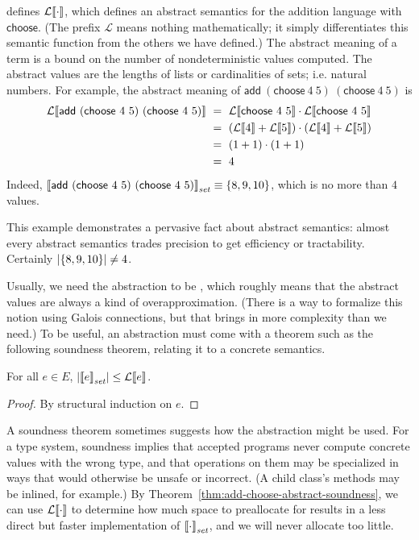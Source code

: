 { defines $\mathcal{L}\!\left\llbracket{\cdot}\right\rrbracket$, which defines an abstract semantics for the addition language with $\mathsf{choose}$.
(The prefix $\mathcal{L}$ means nothing mathematically; it simply differentiates this semantic function from the others we have defined.)
The abstract meaning of a term is a bound on the number of nondeterministic values computed.
The abstract values are the lengths of lists or cardinalities of sets; i.e. natural numbers.
For example, the abstract meaning of $\mathsf{add}~(\mathsf{choose}~4~5)~(\mathsf{choose}~4~5)$ is
\begin{equation}
\begin{aligned}
	\mathcal{L}\!\left\llbracket{\mathsf{add}~(\mathsf{choose}~4~5)~(\mathsf{choose}~4~5)}\right\rrbracket
	&\ =\ \mathcal{L}\!\left\llbracket{\mathsf{choose}~4~5}\right\rrbracket \cdot \mathcal{L}\!\left\llbracket{\mathsf{choose}~4~5}\right\rrbracket
\\
	&\ =\ (\mathcal{L}\!\left\llbracket{4}\right\rrbracket + \mathcal{L}\!\left\llbracket{5}\right\rrbracket) \cdot (\mathcal{L}\!\left\llbracket{4}\right\rrbracket + \mathcal{L}\!\left\llbracket{5}\right\rrbracket)
\\
	&\ =\ (1 + 1) \cdot (1 + 1)
\\
	&\ =\ 4
\end{aligned}
\end{equation}
Indeed, $\left\llbracket{\mathsf{add}~(\mathsf{choose}~4~5)~(\mathsf{choose}~4~5)}\right\rrbracket_\mathit{set} \equiv \{{8,9,10}\}$, which is no more than $4$ values.

This example demonstrates a pervasive fact about abstract semantics: almost every abstract semantics trades precision to get efficiency or tractability.
Certainly $\left|\{{8,9,10}\}\right| \neq 4$.

Usually, we need the abstraction to be , which roughly means that the abstract values are always a kind of overapproximation.
(There is a way to formalize this notion using Galois connections, but that brings in more complexity than we need.)
To be useful, an abstraction must come with a theorem such as the following soundness theorem, relating it to a concrete semantics.

\begin{theorem}
\label{thm:add-choose-abstract-soundness}
For all $e \in E$, $\left|\left\llbracket{e}\right\rrbracket_\mathit{set}\right| \leq \mathcal{L}\!\left\llbracket{e}\right\rrbracket$.
\end{theorem}
\begin{proof}
By structural induction on $e$.
\end{proof}

A soundness theorem sometimes suggests how the abstraction might be used.
For a type system, soundness implies that accepted programs never compute concrete values with the wrong type, and that operations on them may be specialized in ways that would otherwise be unsafe or incorrect.
(A child class's methods may be inlined, for example.)
By Theorem~\ref{thm:add-choose-abstract-soundness}, we can use $\mathcal{L}\!\left\llbracket{\cdot}\right\rrbracket$ to determine how much space to preallocate for results in a less direct but faster implementation of $\left\llbracket{\cdot}\right\rrbracket_\mathit{set}$, and we will never allocate too little.

}
